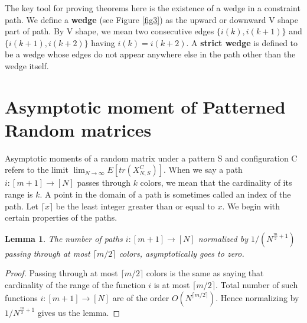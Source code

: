 \documentclass[12pt]{amsart}
\newtheorem{lemma}[thm]{Lemma}
\theoremstyle{definition}
\theoremstyle{remark}
\newcommand\blue{\color{blue}}
\begin{document}
The key tool for proving theorems here is the existence of a wedge in a constraint path. We define a \textbf{wedge} (see Figure \ref{fig3}) as the upward or downward V shape part of path. By V shape, we mean two consecutive edges $\{i(k),i(k+1)\}$ and $\{i(k+1),i(k+2)\}$ having $i(k)=i(k+2)$. A \textbf{strict wedge} is defined to be a wedge whose edges do not appear anywhere else in the path other than the wedge itself.













\section{Asymptotic moment of Patterned Random matrices} \label{sec3}

 Asymptotic moments of a random matrix under a pattern S and configuration C refers to the limit $\lim_{N \to \infty} E[tr(X_{N,S}^C)]$. When we say a path $i:[m+1] \to [N]$ passes through $k$ colors, we mean that the cardinality of its range is $k$. A point in the domain of a path is sometimes called an index of the path. Let $\lceil x \rceil$ be the least integer greater than or equal to $x$. We begin with certain properties of the paths. 

\begin{lemma} \label{lem1}
    The number of paths $i:[m+1] \to [N]$  normalized by ${1}/{(N^{\frac{m}{2} + 1})}$  passing through at most $\lceil m/2 \rceil$ colors, asymptotically goes to zero.
\end{lemma}


\begin{proof}

Passing through at most $\lceil m/2 \rceil$ colors is the same as saying that cardinality of the range of the function $i$ is at most $\lceil m/2 \rceil$. Total number of such functions $i:[m+1] \to [N]$ are of the order $O(N^{\lceil m/2 \rceil})$. Hence normalizing by $1/N^{\frac{m}{2} + 1}$ gives us the lemma.
\end{proof}
\end{document}
